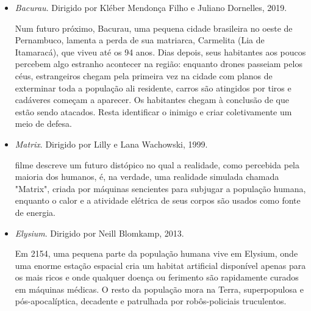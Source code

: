 \documentclass[11pt]{extarticle}
\begin{document}
\begin{itemize}
\item \textit{Bacurau}. Dirigido por Kléber Mendonça Filho e Juliano Dornelles, 2019.

Num futuro próximo, Bacurau, uma pequena cidade brasileira no oeste de Pernambuco, lamenta a perda de sua matriarca, Carmelita (Lia de Itamaracá), que viveu até os 94 anos. Dias depois, seus habitantes aos poucos percebem algo estranho acontecer na região: enquanto drones passeiam pelos céus, estrangeiros chegam pela primeira vez na cidade com planos de exterminar toda a população ali residente, carros são atingidos por tiros e cadáveres começam a aparecer. Os habitantes chegam à conclusão de que estão sendo atacados. Resta identificar o inimigo e criar coletivamente um meio de defesa.

\item \textit{Matrix}. Dirigido por Lilly e Lana Wachowski, 1999. 

 filme descreve um futuro distópico no qual a realidade, como percebida pela maioria dos humanos, é, na verdade, uma realidade simulada chamada "Matrix", criada por máquinas sencientes para subjugar a população humana, enquanto o calor e a atividade elétrica de seus corpos são usados ​​como fonte de energia.

\item \textit{Elysium}. Dirigido por Neill Blomkamp, 2013.

Em 2154, uma pequena parte da população humana vive em Elysium, onde uma enorme estação espacial cria um habitat artificial disponível apenas para os mais ricos e onde qualquer doença ou ferimento são rapidamente curados em máquinas médicas. O resto da população mora na Terra, superpopulosa e pós-apocalíptica, decadente e patrulhada por robôs-policiais truculentos.

\end{itemize}
\end{document}
